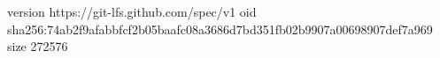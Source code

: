 version https://git-lfs.github.com/spec/v1
oid sha256:74ab2f9afabbfcf2b05baafc08a3686d7bd351fb02b9907a00698907def7a969
size 272576
